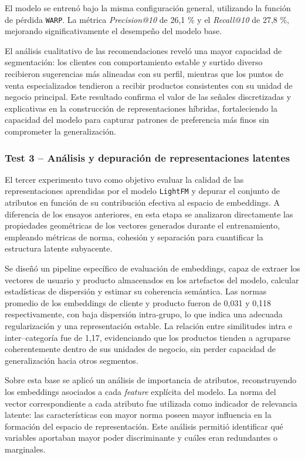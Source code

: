 El modelo se entrenó bajo la misma configuración general, utilizando la función de pérdida \texttt{WARP}. La métrica \textit{Precision@10} de 26{,}1 \% y el \textit{Recall@10} de 27{,}8 \%, mejorando significativamente el desempeño del modelo base.

El análisis cualitativo de las recomendaciones reveló una mayor capacidad de segmentación: los clientes con comportamiento estable y surtido diverso recibieron sugerencias más alineadas con su perfil, mientras que los puntos de venta especializados tendieron a recibir productos consistentes con su unidad de negocio principal. Este resultado confirma el valor de las señales discretizadas y explicativas en la construcción de representaciones híbridas, fortaleciendo la capacidad del modelo para capturar patrones de preferencia más finos sin comprometer la generalización.

\subsubsection{Test 3 – Análisis y depuración de representaciones latentes}

El tercer experimento tuvo como objetivo evaluar la calidad de las representaciones aprendidas por el modelo \texttt{LightFM} y depurar el conjunto de atributos en función de su contribución efectiva al espacio de embeddings. A diferencia de los ensayos anteriores, en esta etapa se analizaron directamente las propiedades geométricas de los vectores generados durante el entrenamiento, empleando métricas de norma, cohesión y separación para cuantificar la estructura latente subyacente.

Se diseñó un pipeline específico de evaluación de embeddings, capaz de extraer los vectores de usuario y producto almacenados en los artefactos del modelo, calcular estadísticas de dispersión y estimar su coherencia semántica. Las normas promedio de los embeddings de cliente y producto fueron de 0,031 y 0,118 respectivamente, con baja dispersión intra-grupo, lo que indica una adecuada regularización y una representación estable. La relación entre similitudes intra e inter–categoría fue de 1,17, evidenciando que los productos tienden a agruparse coherentemente dentro de sus unidades de negocio, sin perder capacidad de generalización hacia otros segmentos.

Sobre esta base se aplicó un análisis de importancia de atributos, reconstruyendo los embeddings asociados a cada \textit{feature} explícita del modelo. La norma del vector correspondiente a cada atributo fue utilizada como indicador de relevancia latente: las características con mayor norma poseen mayor influencia en la formación del espacio de representación. Este análisis permitió identificar qué variables aportaban mayor poder discriminante y cuáles eran redundantes o marginales.

